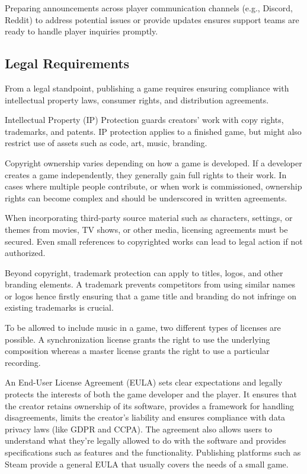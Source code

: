 Preparing announcements across player communication channels (e.g., Discord, Reddit) to address potential issues or provide updates ensures support teams are ready to handle player inquiries promptly.

\subsection{Legal Requirements}
From a legal standpoint, publishing a game requires ensuring compliance with intellectual property laws, consumer rights, and distribution agreements.

Intellectual Property (IP) Protection guards creators’ work with copy rights, trademarks, and patents. IP protection applies to a finished game, but might also restrict use of assets such as code, art, music, branding.

Copyright ownership varies depending on how a game is developed. If a developer creates a game independently, they generally gain full rights to their work. In cases where multiple people contribute, or when work is commissioned, ownership rights can become complex and should be underscored in written agreements.

When incorporating third-party source material such as characters, settings, or themes from movies, TV shows, or other media, licensing agreements must be secured. Even small references to copyrighted works can lead to legal action if not authorized.

Beyond copyright, trademark protection can apply to titles, logos, and other branding elements. A trademark prevents competitors from using similar names or logos hence firstly ensuring that a game title and branding do not infringe on existing trademarks is crucial.

To be allowed to include music in a game, two different types of licenses are possible. A synchronization license grants the right to use the underlying composition whereas a master license grants the right to use a particular recording.

An End-User License Agreement (EULA) sets clear expectations and legally protects the interests of both the game developer and the player. It ensures that the creator retains ownership of its software, provides a framework for handling disagreements, limits the creator’s liability and ensures compliance with data privacy laws (like GDPR and CCPA). The agreement also allows users to understand what they're legally allowed to do with the software and provides specifications such as features and the functionality. Publishing platforms such as Steam provide a general EULA that usually covers the needs of a small game. 

